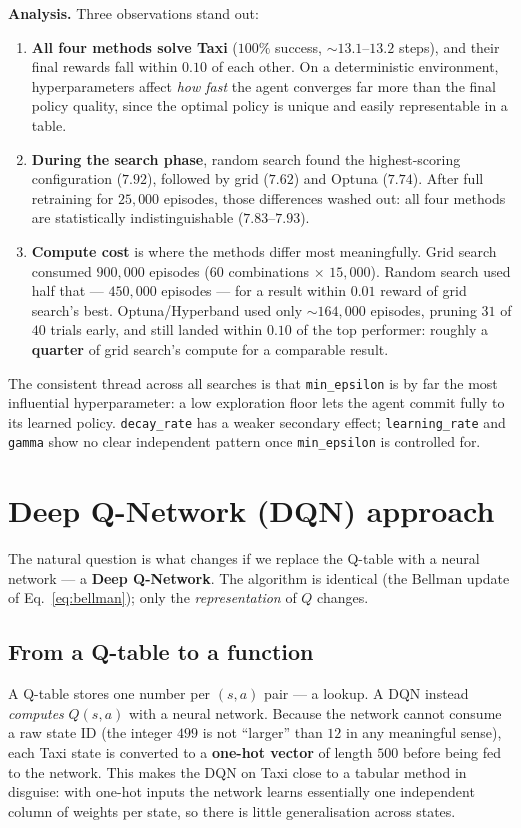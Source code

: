 \documentclass[11pt]{article}
\begin{document}
\noindent\textbf{Analysis.} Three observations stand out:
\begin{enumerate}[noitemsep]
  \item \textbf{All four methods solve Taxi} ($100\%$ success, ${\sim}13.1$--$13.2$ steps), and
        their final rewards fall within $0.10$ of each other. On a deterministic environment,
        hyperparameters affect \emph{how fast} the agent converges far more than the final
        policy quality, since the optimal policy is unique and easily representable in a table.
  \item \textbf{During the search phase}, random search found the highest-scoring configuration
        ($7.92$), followed by grid ($7.62$) and Optuna ($7.74$). After full retraining for
        $25{,}000$ episodes, those differences washed out: all four methods are statistically
        indistinguishable ($7.83$--$7.93$).
  \item \textbf{Compute cost} is where the methods differ most meaningfully. Grid search
        consumed $900{,}000$ episodes ($60$ combinations $\times$ $15{,}000$). Random search used
        half that --- $450{,}000$ episodes --- for a result within $0.01$ reward of grid search's
        best. Optuna/Hyperband used only ${\sim}164{,}000$ episodes, pruning $31$ of $40$ trials
        early, and still landed within $0.10$ of the top performer: roughly a \textbf{quarter} of
        grid search's compute for a comparable result.
\end{enumerate}
The consistent thread across all searches is that \texttt{min\_epsilon} is by far the most
influential hyperparameter: a low exploration floor lets the agent commit fully to its learned
policy. \texttt{decay\_rate} has a weaker secondary effect; \texttt{learning\_rate} and
\texttt{gamma} show no clear independent pattern once \texttt{min\_epsilon} is controlled for.

\section{Deep Q-Network (DQN) approach}
\label{sec:dqn}
The natural question is what changes if we replace the Q-table with a neural network --- a
\textbf{Deep Q-Network}. The algorithm is identical (the Bellman update of
Eq.~\eqref{eq:bellman}); only the \emph{representation} of $Q$ changes.

\subsection{From a Q-table to a function}
A Q-table stores one number per $(s,a)$ pair --- a lookup. A DQN instead \emph{computes}
$Q(s,a)$ with a neural network. Because the network cannot consume a raw state ID (the integer
$499$ is not ``larger'' than $12$ in any meaningful sense), each Taxi state is converted to a
\textbf{one-hot vector} of length $500$ before being fed to the network. This makes the DQN on
Taxi close to a tabular method in disguise: with one-hot inputs the network learns essentially
one independent column of weights per state, so there is little generalisation across states.
\end{document}

